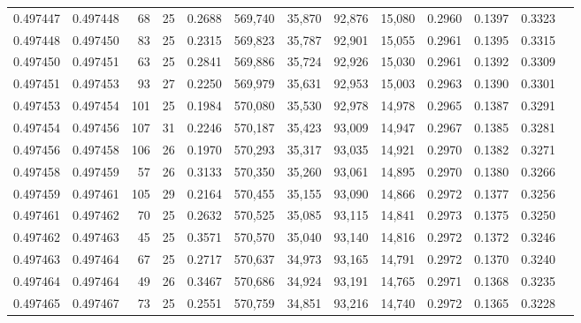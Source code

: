 \begin{tabular}{rrrrrrrrrrrrr}
0.497447 & 0.497448 &  68 &  25 &                                     0.2688 & 569,740 &  35,870 &  92,876 &  15,080 & 0.2960 & 0.1397 & 0.3323 \\
0.497448 & 0.497450 &  83 &  25 &                                     0.2315 & 569,823 &  35,787 &  92,901 &  15,055 & 0.2961 & 0.1395 & 0.3315 \\
0.497450 & 0.497451 &  63 &  25 &                                     0.2841 & 569,886 &  35,724 &  92,926 &  15,030 & 0.2961 & 0.1392 & 0.3309 \\
0.497451 & 0.497453 &  93 &  27 &                                     0.2250 & 569,979 &  35,631 &  92,953 &  15,003 & 0.2963 & 0.1390 & 0.3301 \\
0.497453 & 0.497454 & 101 &  25 &                                     0.1984 & 570,080 &  35,530 &  92,978 &  14,978 & 0.2965 & 0.1387 & 0.3291 \\
0.497454 & 0.497456 & 107 &  31 &                                     0.2246 & 570,187 &  35,423 &  93,009 &  14,947 & 0.2967 & 0.1385 & 0.3281 \\
0.497456 & 0.497458 & 106 &  26 &                                     0.1970 & 570,293 &  35,317 &  93,035 &  14,921 & 0.2970 & 0.1382 & 0.3271 \\
0.497458 & 0.497459 &  57 &  26 &                                     0.3133 & 570,350 &  35,260 &  93,061 &  14,895 & 0.2970 & 0.1380 & 0.3266 \\
0.497459 & 0.497461 & 105 &  29 &                                     0.2164 & 570,455 &  35,155 &  93,090 &  14,866 & 0.2972 & 0.1377 & 0.3256 \\
0.497461 & 0.497462 &  70 &  25 &                                     0.2632 & 570,525 &  35,085 &  93,115 &  14,841 & 0.2973 & 0.1375 & 0.3250 \\
0.497462 & 0.497463 &  45 &  25 &                                     0.3571 & 570,570 &  35,040 &  93,140 &  14,816 & 0.2972 & 0.1372 & 0.3246 \\
0.497463 & 0.497464 &  67 &  25 &                                     0.2717 & 570,637 &  34,973 &  93,165 &  14,791 & 0.2972 & 0.1370 & 0.3240 \\
0.497464 & 0.497464 &  49 &  26 &                                     0.3467 & 570,686 &  34,924 &  93,191 &  14,765 & 0.2971 & 0.1368 & 0.3235 \\
0.497465 & 0.497467 &  73 &  25 &                                     0.2551 & 570,759 &  34,851 &  93,216 &  14,740 & 0.2972 & 0.1365 & 0.3228 \\

\end{tabular}

